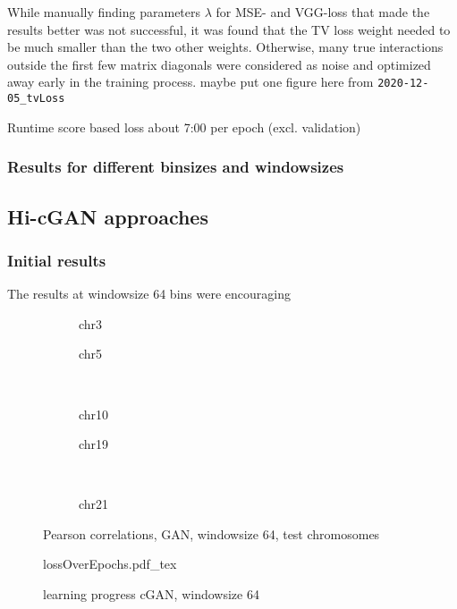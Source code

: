 While manually finding parameters $\lambda$ for MSE- and VGG-loss that made the results better was not successful,
it was found that the TV loss weight needed to be much smaller than the two other weights.
Otherwise, many true interactions outside the first few matrix diagonals were considered as noise and optimized away early in the training process.
\xxx maybe put one figure here from \texttt{2020-12-05\_tvLoss}

\xxx Runtime score based loss about 7:00 per epoch (excl. validation)


\subsubsection{Results for different binsizes and windowsizes}

\subsection{Hi-cGAN approaches}
\subsubsection{Initial results}
The results at windowsize 64 bins were encouraging \xxx
\begin{figure}[p]
    \begin{subfigure}{0.45\textwidth}
        \scriptsize
        \caption{chr3}
    \end{subfigure} \hfill
    \begin{subfigure}{0.45\textwidth}
        \scriptsize
        \caption{chr5}
    \end{subfigure}\\[5mm]
    \begin{subfigure}{0.45\textwidth}
        \scriptsize
        \caption{chr10}
    \end{subfigure}\hfill
    \begin{subfigure}{0.45\textwidth}
        \scriptsize
        \caption{chr19}
    \end{subfigure}\\[3mm]
    \centering
    \begin{subfigure}{0.45\textwidth}
        \scriptsize
        \caption{chr21}
    \end{subfigure}
    \caption{Pearson correlations, GAN, windowsize 64, test chromosomes}
    \label{fig:results:GAN64_pearson}
\end{figure}
\begin{figure}[hbp]
 \centering
 \scriptsize
 {lossOverEpochs.pdf_tex}
 \caption{learning progress cGAN, windowsize 64} \label{fig:results:GAN64_lossEpochs}
\end{figure}

